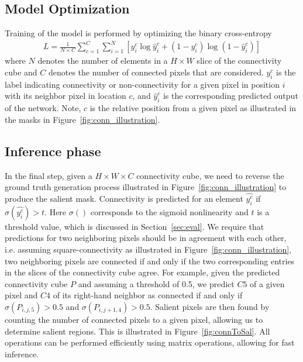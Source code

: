 \documentclass[journal]{IEEEtran}
\begin{document}
\subsection{Model Optimization}
Training of the model is performed by optimizing the binary cross-entropy
\begin{align}
    L = \frac{1}{N\times C} \sum_{c=1}^C \sum_{i=1}^N [y_i^c \log\hat{y}_i^c + (1-y_i^c) \log (1-\hat{y}_i^c)]
\end{align}
where $N$ denotes the number of elements in a $H\times W$ slice of the connectivity cube and $C$ denotes the number of connected pixels that are considered. $y_i^c$ is the label indicating connectivity or non-connectivity for a given pixel in position $i$ with its neighbor pixel in location $c$, and $\hat{y}_i^c$ is the corresponding predicted output of the network. Note, $c$ is the relative position from a given pixel as illustrated in the masks in Figure~\ref{fig:conn_illustration}.

\subsection{Inference phase}
\label{connToSalient}
In the final step, given a $H\times W\times C$ connectivity cube, we need to reverse the ground truth generation process illustrated in Figure~\ref{fig:conn_illustration} to produce the salient mask. Connectivity is predicted for an element $\hat{y_i^c}$ if $\sigma(\hat{y_i^c}) > t$. Here $\sigma()$ corresponds to the sigmoid nonlinearity and $t$ is a threshold value, which is discussed in Section~\ref{sec:eval}. We require that predictions for two neighboring pixels should be in agreement with each other, i.e. assuming square-connectivity as illustrated in Figure~\ref{fig:conn_illustration}, two neighboring pixels are connected if and only if the two corresponding entries in the slices of the connectivity cube agree. For example, given the predicted connectivity cube $P$ and assuming a threshold of 0.5, we predict $C5$ of a given pixel and $C4$ of its right-hand neighbor as connected if and only if $\sigma(P_{i,j,5}) > 0.5$ and $ \sigma(P_{i,j+1,4}) > 0.5$.
Salient pixels are then found by counting the number of connected pixels to a given pixel, allowing us to determine salient regions. This is illustrated in Figure~\ref{fig:connToSal}. All operations can be performed efficiently using matrix operations, allowing for fast inference.
\end{document}
